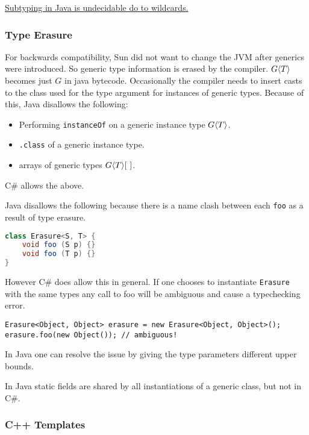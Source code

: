 \documentclass{article}
\begin{document}
\begin{remark}\label{javaisreallystupid}
\href{https://arxiv.org/pdf/1605.05274.pdf}{Subtyping in Java is undecidable do to wildcards.}
\end{remark}

\subsubsection{Type Erasure}

For backwards compatibility, Sun did not want to change the JVM after generics were introduced. So generic type information is erased by the compiler. $G \langle T \rangle$ becomes just $G$ in java bytecode. Occasionally the compiler needs to insert casts to the class used for the type argument for instances of generic types. Because of this, Java disallows the following:
\begin{itemize}
\item Performing \texttt{instanceOf} on a generic instance type $G \langle T \rangle$.
\item \texttt{.class} of a generic instance type.
\item arrays of generic types $G \langle T \rangle[~]$.
\end{itemize}

C\# allows the above.

\begin{example}
Java disallows the following because there is a name clash between each \texttt{foo} as a result of type erasure.
\begin{lstlisting}[language=Java]
class Erasure<S, T> {
    void foo (S p) {}
    void foo (T p) {}
}
\end{lstlisting}
However C\# does allow this in general.
If one chooses to instantiate \texttt{Erasure} with the same types any call to foo will be ambiguous and cause a typechecking error.
\begin{lstlisting}[language={[Sharp]C}]
Erasure<Object, Object> erasure = new Erasure<Object, Object>();
erasure.foo(new Object()); // ambiguous!
\end{lstlisting}
In Java one can resolve the issue by giving the type parameters different upper bounds.
\end{example}

In Java static fields are shared by all instantiations of a generic class, but not in C\#.

\subsubsection{C++ Templates}
\end{document}
